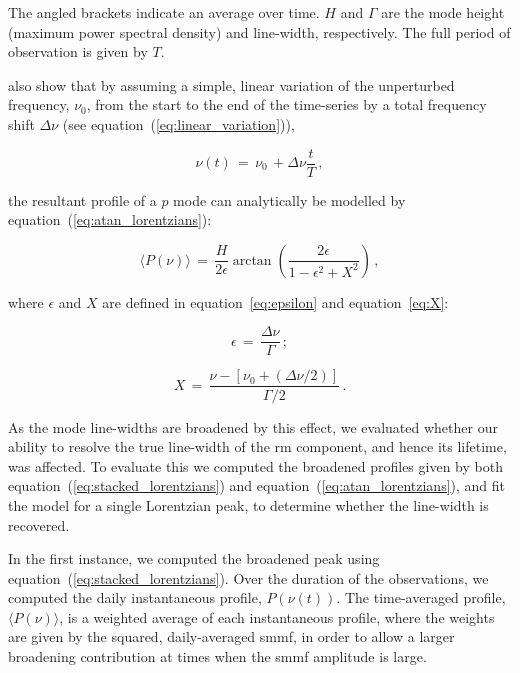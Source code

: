 The angled brackets indicate an average over time. $H$ and $\Gamma$ are the mode height (maximum power spectral density) and line-width, respectively. The full period of observation is given by $T$.

\citet{chaplin_distortion_2008} also show that by assuming a simple, linear variation of the unperturbed frequency, $\nu_0$, from the start to the end of the time-series by a total frequency shift $\Delta\nu$ (see equation~(\ref{eq:linear_variation})),

\begin{equation}
\nu(t) \, = \, \nu_0 \, +  \Delta\nu \frac{t}{T} \, ,
\label{eq:linear_variation}
\end{equation}

the resultant profile of a $p$ mode can analytically be modelled by equation~(\ref{eq:atan_lorentzians}):

\begin{equation}
\langle P(\nu) \rangle \, = \, \frac{H}{2\epsilon} \arctan \left( \frac{2 \epsilon}{1 - \epsilon^2 + X^2 } \right) \, ,
\label{eq:atan_lorentzians}
\end{equation}

where $\epsilon$ and $X$ are defined in equation~\ref{eq:epsilon} and equation~\ref{eq:X}:

\begin{equation}
\epsilon \, = \, \frac{\Delta\nu}{\Gamma} \, ;
\label{eq:epsilon}
\end{equation}

\begin{equation}
X \, = \, \frac{\nu - [\nu_0 + (\Delta\nu/2)]}{\Gamma /2} \, .
\label{eq:X}
\end{equation}

As the mode line-widths are broadened by this effect, we evaluated whether our ability to resolve the true line-width of the \gls{rm} component, and hence its lifetime, was affected. To evaluate this we computed the broadened profiles given by both equation~(\ref{eq:stacked_lorentzians}) and equation~(\ref{eq:atan_lorentzians}), and fit the model for a single Lorentzian peak, to determine whether the line-width is recovered.

In the first instance, we computed the broadened peak using equation~(\ref{eq:stacked_lorentzians}). Over the duration of the observations, we computed the daily instantaneous profile, $P(\nu(t))$. The time-averaged profile, $ \langle P(\nu) \rangle$, is a weighted average of each instantaneous profile, where the weights are given by the squared, daily-averaged \gls{smmf}, in order to allow a larger broadening contribution at times when the \gls{smmf} amplitude is large.

